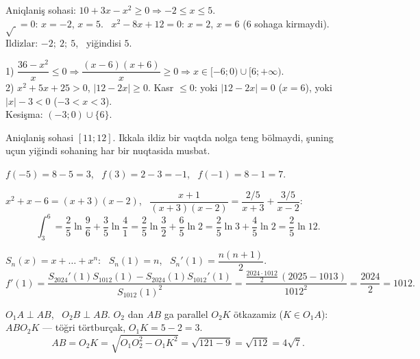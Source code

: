 Aniqlaniş sohasi: $10+3x-x^2\ge0\Rightarrow -2\le x\le5$.\\
$\sqrt{\ }=0$: $x=-2$, $x=5$. \ $x^2-8x+12=0$: $x=2$, $x=6$ ($6$ sohaga kirmaydi).\\
Ildizlar: $-2;\ 2;\ 5$, \ yiğindisi $5$.

1) $\dfrac{36-x^2}x\le0\Rightarrow\dfrac{(x-6)(x+6)}x\ge0\Rightarrow x\in[-6;0)\cup[6;+\infty)$.\\
2) $x^2+5x+25>0$, $|12-2x|\ge0$. Kasr $\le0$: yoki $|12-2x|=0$ ($x=6$), yoki $|x|-3<0$ ($-3<x<3$).\\
Kesişma: $(-3;0)\cup\{6\}$.

Aniqlaniş sohasi $[11;12]$. Ikkala ildiz bir vaqtda nolga teng bölmaydi, şuning uçun yiğindi sohaning har bir nuqtasida musbat.

$f(-5)=8-5=3$, \ $f(3)=2-3=-1$, \ $f(-1)=8-1=7$.

$x^2+x-6=(x+3)(x-2)$, \ $\dfrac{x+1}{(x+3)(x-2)}=\dfrac{2/5}{x+3}+\dfrac{3/5}{x-2}$:
\[\int_3^6=\frac25\ln\frac96+\frac35\ln\frac41=\frac25\ln\frac32+\frac65\ln2=\frac25\ln3+\frac45\ln2=\frac25\ln12.\]

$S_n(x)=x+\dots+x^n$: \ $S_n(1)=n$, \ $S_n'(1)=\dfrac{n(n+1)}2$.
\[f'(1)=\frac{S_{2024}'(1)S_{1012}(1)-S_{2024}(1)S_{1012}'(1)}{S_{1012}(1)^2}=\frac{\frac{2024\cdot1012}2\,(2025-1013)}{1012^2}=\frac{2024}2=1012.\]

$O_1A\perp AB$, \ $O_2B\perp AB$. $O_2$ dan $AB$ ga parallel $O_2K$ ötkazamiz ($K\in O_1A$): $ABO_2K$ — töğri törtburçak, $O_1K=5-2=3$.
\[AB=O_2K=\sqrt{O_1O_2^2-O_1K^2}=\sqrt{121-9}=\sqrt{112}=4\sqrt7.\]

